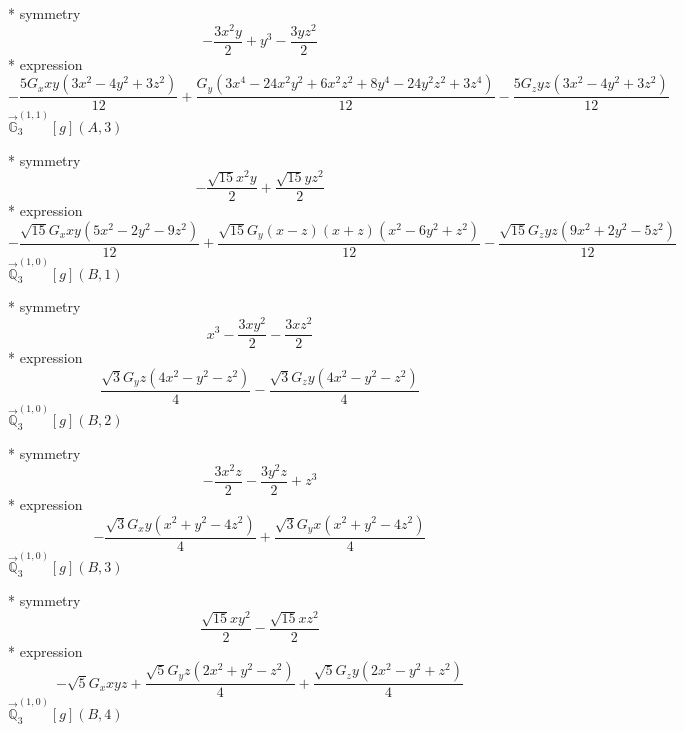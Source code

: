 \documentclass[fleqn,8pt]{jsarticle}
\begin{document}
\noindent\quad ** symmetry
\begin{dmath*}
- \frac{3 x^{2} y}{2} + y^{3} - \frac{3 y z^{2}}{2}
\end{dmath*}
\noindent\quad ** expression
\begin{dmath*}
- \frac{5 G_{x} x y \left(3 x^{2} - 4 y^{2} + 3 z^{2}\right)}{12} + \frac{G_{y} \left(3 x^{4} - 24 x^{2} y^{2} + 6 x^{2} z^{2} + 8 y^{4} - 24 y^{2} z^{2} + 3 z^{4}\right)}{12} - \frac{5 G_{z} y z \left(3 x^{2} - 4 y^{2} + 3 z^{2}\right)}{12}
\end{dmath*}
\noindent\quad $\vec{\mathbb{G}}_{3}^{(1,1)}[g](A,3)$

\noindent\quad ** symmetry
\begin{dmath*}
- \frac{\sqrt{15} x^{2} y}{2} + \frac{\sqrt{15} y z^{2}}{2}
\end{dmath*}
\noindent\quad ** expression
\begin{dmath*}
- \frac{\sqrt{15} G_{x} x y \left(5 x^{2} - 2 y^{2} - 9 z^{2}\right)}{12} + \frac{\sqrt{15} G_{y} \left(x - z\right) \left(x + z\right) \left(x^{2} - 6 y^{2} + z^{2}\right)}{12} - \frac{\sqrt{15} G_{z} y z \left(9 x^{2} + 2 y^{2} - 5 z^{2}\right)}{12}
\end{dmath*}
\noindent\quad $\vec{\mathbb{Q}}_{3}^{(1,0)}[g](B,1)$

\noindent\quad ** symmetry
\begin{dmath*}
x^{3} - \frac{3 x y^{2}}{2} - \frac{3 x z^{2}}{2}
\end{dmath*}
\noindent\quad ** expression
\begin{dmath*}
\frac{\sqrt{3} G_{y} z \left(4 x^{2} - y^{2} - z^{2}\right)}{4} - \frac{\sqrt{3} G_{z} y \left(4 x^{2} - y^{2} - z^{2}\right)}{4}
\end{dmath*}
\noindent\quad $\vec{\mathbb{Q}}_{3}^{(1,0)}[g](B,2)$

\noindent\quad ** symmetry
\begin{dmath*}
- \frac{3 x^{2} z}{2} - \frac{3 y^{2} z}{2} + z^{3}
\end{dmath*}
\noindent\quad ** expression
\begin{dmath*}
- \frac{\sqrt{3} G_{x} y \left(x^{2} + y^{2} - 4 z^{2}\right)}{4} + \frac{\sqrt{3} G_{y} x \left(x^{2} + y^{2} - 4 z^{2}\right)}{4}
\end{dmath*}
\noindent\quad $\vec{\mathbb{Q}}_{3}^{(1,0)}[g](B,3)$

\noindent\quad ** symmetry
\begin{dmath*}
\frac{\sqrt{15} x y^{2}}{2} - \frac{\sqrt{15} x z^{2}}{2}
\end{dmath*}
\noindent\quad ** expression
\begin{dmath*}
- \sqrt{5} G_{x} x y z + \frac{\sqrt{5} G_{y} z \left(2 x^{2} + y^{2} - z^{2}\right)}{4} + \frac{\sqrt{5} G_{z} y \left(2 x^{2} - y^{2} + z^{2}\right)}{4}
\end{dmath*}
\noindent\quad $\vec{\mathbb{Q}}_{3}^{(1,0)}[g](B,4)$
\end{document}
